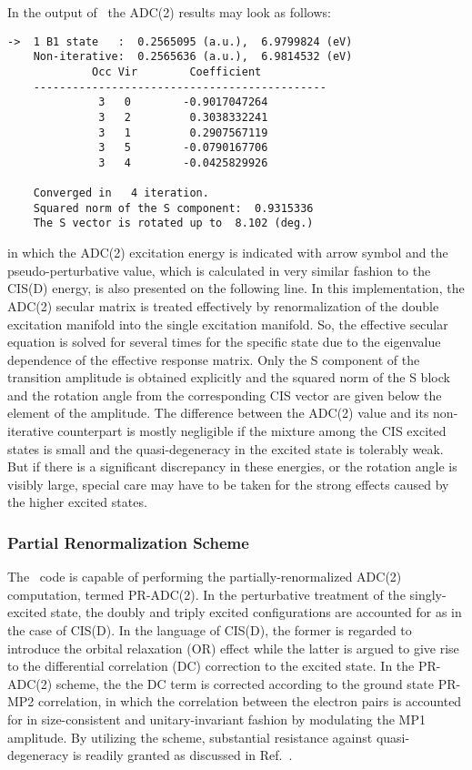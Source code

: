 In the output of \PSIadc\, the ADC(2) results may look as follows:
\begin{verbatim}
->  1 B1 state   :  0.2565095 (a.u.),  6.9799824 (eV)
    Non-iterative:  0.2565636 (a.u.),  6.9814532 (eV)
             Occ Vir        Coefficient
    ---------------------------------------------
              3   0        -0.9017047264
              3   2         0.3038332241
              3   1         0.2907567119
              3   5        -0.0790167706
              3   4        -0.0425829926
              
    Converged in   4 iteration.
    Squared norm of the S component:  0.9315336
    The S vector is rotated up to  8.102 (deg.)
\end{verbatim} 
in which the ADC(2) excitation energy is indicated with arrow symbol
and the pseudo-perturbative value, which is calculated in very similar
fashion to the CIS(D) energy, is also presented on the following line. In
this implementation, the ADC(2) secular matrix is treated effectively
by renormalization of the double excitation manifold into the single
excitation manifold. So, the effective secular equation is solved for
several times for the specific state due to the eigenvalue dependence of
the effective response matrix. Only the S component of the transition
amplitude is obtained explicitly and the squared norm of the S block
and the rotation angle from the corresponding CIS vector are given
below the element of the amplitude. The difference between the ADC(2)
value and its non-iterative counterpart is mostly negligible if the
mixture among the CIS excited states is small and the quasi-degeneracy
in the excited state is tolerably weak. But if there is a significant
discrepancy in these energies, or the rotation angle is visibly large,
special care may have to be taken for the strong effects caused by the
higher excited states.

\subsubsection{Partial Renormalization Scheme}
The \PSIadc\ code is capable of performing the partially-renormalized
ADC(2) computation, termed PR-ADC(2). In the perturbative treatment of
the singly-excited state, the doubly and triply excited configurations
are accounted for as in the case of CIS(D). In the language of 
CIS(D), the former is regarded to introduce the orbital relaxation (OR)
effect while the latter is argued to give rise to the differential
correlation (DC) correction to the excited state. In the PR-ADC(2)
scheme, the the DC term is corrected according to the ground state
PR-MP2 correlation, in which the correlation between the electron pairs
is accounted for in size-consistent and unitary-invariant fashion by
modulating the MP1 amplitude. By utilizing the  scheme, substantial
resistance against quasi-degeneracy is readily granted as discussed
in Ref.~\cite{Saitow:2012}.

